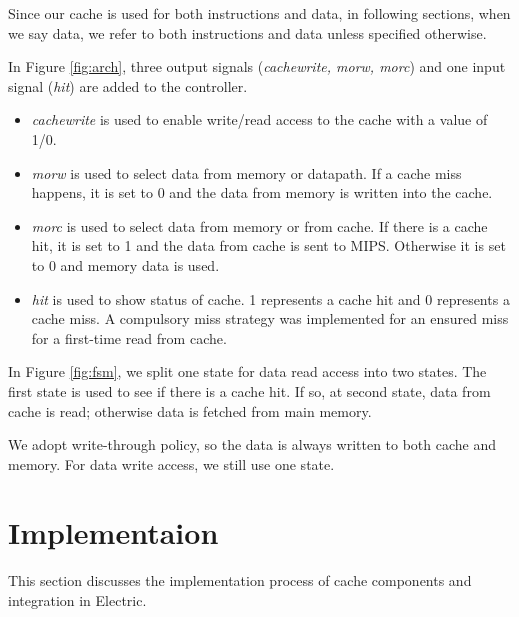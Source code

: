 \documentclass[conference]{IEEEtran}
\begin{document}
Since our cache is used for both instructions and data, in following sections,
	  when we say data, we refer to both instructions and data unless specified
	  otherwise. 

In Figure \ref{fig:arch}, three output signals (\textit{cachewrite, morw, morc}) and one input signal
(\textit{hit}) are added to the controller. 

\begin{itemize}
\item\textit{cachewrite} is used to
enable write/read access to the cache with a value of 1/0. 

\item\textit{morw} is used
to select data from memory or datapath. If a cache miss happens, it is set
to 0 and the data from memory is written into the cache. 

\item\textit{morc} is used to select data from memory or from cache. If there is a
cache hit, it is set to 1 and the data from cache is sent to MIPS. Otherwise it
is set to 0 and memory data is used.

\item\textit{hit} is used to show status of cache. 1 represents a cache hit and
0 represents a cache miss. A compulsory miss strategy was implemented for an ensured miss for a first-time read from cache.
\end{itemize}

In Figure \ref{fig:fsm}, we split one state for data read
access into two states. The first state is used to see if there is a cache hit.
If so, at second state, data from cache is read; otherwise data is fetched from
main memory. 

We adopt write-through policy, so the data is always written to both cache and
memory. For data write access, we still use one state.

\section{Implementaion}\label{implementation}
This section discusses the implementation process of cache components and integration in Electric.
\end{document}
